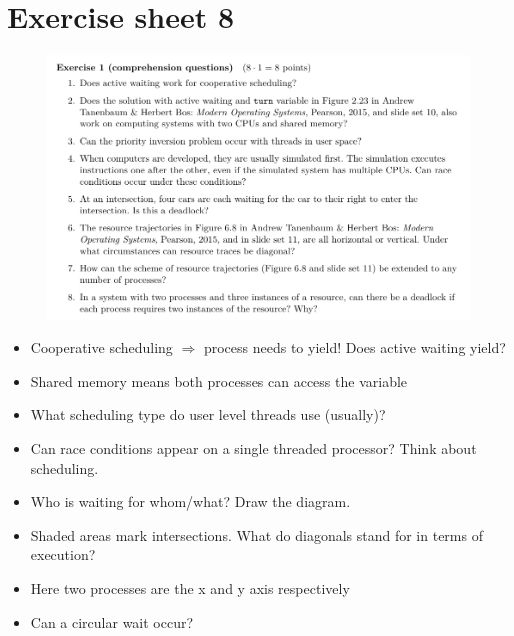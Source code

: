 \documentclass[10pt]{beamer}
\begin{document}
\section*{Exercise sheet 8}
\frame{\sectionpage}
\begin{frame}{}
 \begin{figure}
           \includegraphics[keepaspectratio, width=\textwidth, height=\textheight-2\baselineskip-2\baselineskip]{img/ex8_100.png} \\
        \end{figure}
        \framebreak
        \begin{itemize}
         \item Cooperative scheduling $\Rightarrow$ process needs to yield! Does active waiting yield?
         \item Shared memory means both processes can access the variable
         \item What scheduling type do user level threads use (usually)?
         \item Can race conditions appear on a single threaded processor? Think about scheduling.
         \item Who is waiting for whom/what? Draw the diagram.
         \item Shaded areas mark intersections. What do diagonals stand for in terms of execution?
         \item Here two processes are the x and y axis respectively
         \item Can a circular wait occur?
        \end{itemize}
        \framebreak
        

\end{frame}
\end{document}
